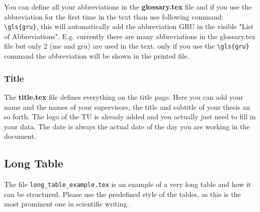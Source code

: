 You can define all your abbreviations in the \textbf{glossary.tex} file and if you use the abbreviation for the first time in the text than use following command: \verb!\gls{gru}!, this will automatically add the abbreviation GRU in the visible "List of Abbreviations". 
E.g. currently there are many abbreviations in the glossary.tex file but only 2 (\gls{me} and \gls{gru}) are used in the text. only if you use the  \verb!\gls{gru}! command the abbreviation will be shown in the printed file. 

\subsubsection{Title}
The \textbf{title.tex} file defines everything on the title page. Here you can add your name and the names of your supervisors, the title and subtitle of your thesis an so forth. The logo of the TU is already added and you actually just need to fill in your data. The date is always the actual date of the day you are working in the document. 

\subsection{Long Table}
The file \verb!long_table_example.tex! is an example of a very long table and how it can be structured. Please use the predefined style of the tables, as this is the most prominent one in scientific writing. 


